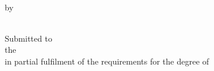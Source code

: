 \thispagestyle{empty} 
\onehalfspacing
\begin{center}
    \null
    \vfill
    \MakeUppercase{\textbf{\thesistitle}} \\
    \vfill
    by \\
    \student \\
    
    \vspace{5em}
    
    Submitted to \\
    the \school \\
    in partial fulfilment of the requirements for the degree of \\
    \degree \\
    
    \vspace{5em}
    
    \uni \\
    \uniloc \\
    \month~\year

\end{center}